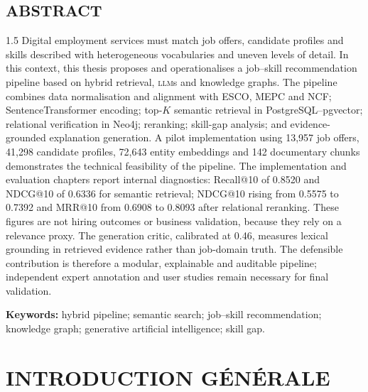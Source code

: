 \documentclass[12pt,twoside]{report}
\newcommand{\LLM}{\textsc{llm}}
\begin{document}
\begin{singlespace}
\chapter*{ABSTRACT}
\begin{spacing}{1.5}
Digital employment services must match job offers, candidate profiles and skills described with heterogeneous vocabularies and uneven levels of detail. In this context, this thesis proposes and operationalises a job--skill recommendation pipeline based on hybrid retrieval, \LLM{}s and knowledge graphs. The pipeline combines data normalisation and alignment with ESCO, MEPC and NCF; SentenceTransformer encoding; top-$K$ semantic retrieval in PostgreSQL--pgvector; relational verification in Neo4j; reranking; skill-gap analysis; and evidence-grounded explanation generation. A pilot implementation using 13,957 job offers, 41,298 candidate profiles, 72,643 entity embeddings and 142 documentary chunks demonstrates the technical feasibility of the pipeline. The implementation and evaluation chapters report internal diagnostics: Recall@10 of 0.8520 and NDCG@10 of 0.6336 for semantic retrieval; NDCG@10 rising from 0.5575 to 0.7392 and MRR@10 from 0.6908 to 0.8093 after relational reranking. These figures are not hiring outcomes or business validation, because they rely on a relevance proxy. The generation critic, calibrated at 0.46, measures lexical grounding in retrieved evidence rather than job-domain truth. The defensible contribution is therefore a modular, explainable and auditable pipeline; independent expert annotation and user studies remain necessary for final validation.

\textbf{Keywords:} hybrid pipeline; semantic search; job--skill recommendation; knowledge graph; generative artificial intelligence; skill gap.
\end{spacing}


\end{singlespace}
\newpage
{}
\linespread{1.4}\selectfont







\chapter*{INTRODUCTION GÉNÉRALE}
\end{document}
